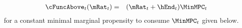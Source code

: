   \begin{eqnarray}
    \cFuncAbove_{t}(\mRat_{t}) & = & (\mRat_{t} + \hEnd_{t})\MinMPC_{t} \label{eq:cFuncAbove}
  \end{eqnarray}
  for a constant minimal marginal propensity to consume $\MinMPC_{t}$ given below.
